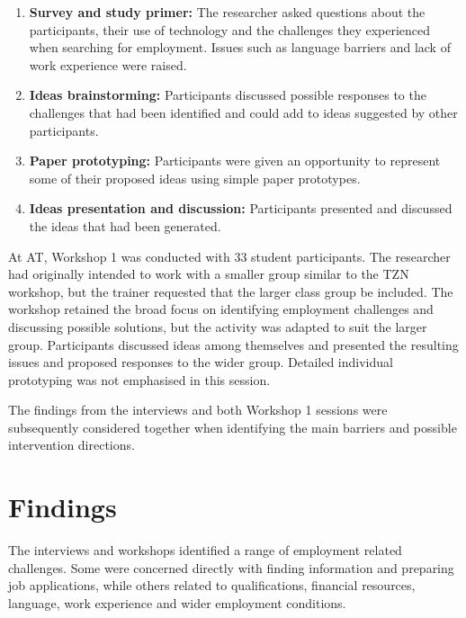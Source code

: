 \begin{enumerate}
    \item \textbf{Survey and study primer:} The researcher asked questions about the participants, their use of technology and the challenges they experienced when searching for employment. Issues such as language barriers and lack of work experience were raised.

    \item \textbf{Ideas brainstorming:} Participants discussed possible responses to the challenges that had been identified and could add to ideas suggested by other participants.

    \item \textbf{Paper prototyping:} Participants were given an opportunity to represent some of their proposed ideas using simple paper prototypes.

    \item \textbf{Ideas presentation and discussion:} Participants presented and discussed the ideas that had been generated.
\end{enumerate}

At AT, Workshop 1 was conducted with 33 student participants. The researcher had originally intended to work with a smaller group similar to the TZN workshop, but the trainer requested that the larger class group be included. The workshop retained the broad focus on identifying employment challenges and discussing possible solutions, but the activity was adapted to suit the larger group. Participants discussed ideas among themselves and presented the resulting issues and proposed responses to the wider group. Detailed individual prototyping was not emphasised in this session.

The findings from the interviews and both Workshop 1 sessions were subsequently considered together when identifying the main barriers and possible intervention directions.


\section{Findings}

The interviews and workshops identified a range of employment related challenges. Some were concerned directly with finding information and preparing job applications, while others related to qualifications, financial resources, language, work experience and wider employment conditions.



